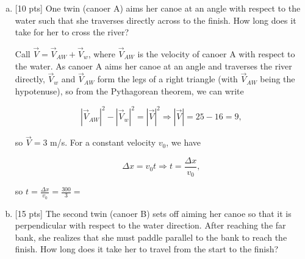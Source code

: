 \documentclass{article}[10pt]
\begin{document}
\begin{enumerate}
\begin{center}
\end{center}

\begin{enumerate}[(a)]

\item {[}10 pts] One twin (canoer A) aims her canoe at an angle with respect to the water such that she traverses directly across to the finish. How long
does it take for her to cross the river? \\

{\color{red} Call $\vec{V} = \vec{V}_{AW} + \vec{V}_w$, where $\vec{V}_{AW}$ is the velocity of canoer A with respect to the water. As canoer A
aims her canoe at an angle and traverses the river directly, $\vec{V}_w$ and $\vec{V}_{AW}$ form the legs of a right triangle (with $\vec{V}_{AW}$
being the hypotenuse), so from the Pythagorean theorem, we can write 

$$ \left| \vec{V}_{AW} \right|^2 - \left| \vec{V}_w \right|^2  = \left| \vec{V} \right|^2 \Longrightarrow \left| \vec{V} \right| = 25 - 16 = 9,$$

so $\vec{V} = 3$ m/s. For a constant velocity $v_0$, we have 

$$ \Delta x = v_0 t \Longrightarrow t = \frac{\Delta x}{v_0},$$

so $t = \frac{\Delta x}{v_0} = \frac{300}{3} = $ }

\item {[}15 pts] The second twin (canoer B) sets off aiming her canoe so that it is perpendicular with respect to the water direction. After reaching the far
bank, she realizes that she must paddle parallel to the bank to reach the finish. How long does it take her to travel from the start to the finish? \\


\end{enumerate}
\end{enumerate}
\end{document}
